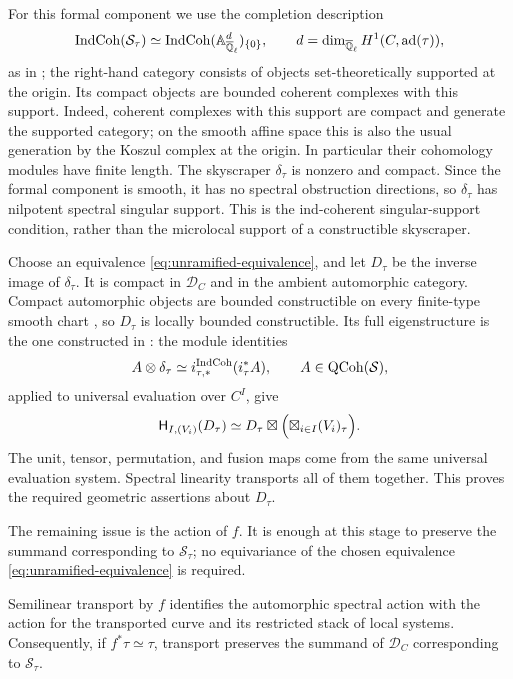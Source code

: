 For this formal component we use the completion description
\[
 \operatorname{IndCoh}(\mathcal S_\tau)
       \simeq\operatorname{IndCoh}(\mathbb A^d_{\overline{\mathbb Q}_{\ell}})_{\{0\}},
 \qquad d=\dim_{\overline{\mathbb Q}_{\ell}} H^1(C,\operatorname{ad}(\tau)),
\]
as in \cite[Sections~21.1.7--21.1.10]{AGKRRV}; the right-hand category
consists of objects set-theoretically supported at the origin.  Its
compact objects are bounded coherent complexes with this support.
Indeed, coherent complexes with this support are compact and generate the supported
category; on the smooth affine space this is also the usual generation
by the Koszul complex at the origin.  In particular their cohomology
modules have finite length.  The skyscraper $\delta_\tau$ is nonzero and
compact.  Since the formal component is smooth, it has no spectral
obstruction directions, so $\delta_\tau$ has nilpotent spectral singular
support.  This is the ind-coherent singular-support condition, rather
than the microlocal support of a constructible skyscraper.

Choose an equivalence \eqref{eq:unramified-equivalence}, and let $D_\tau$
be the inverse image of $\delta_\tau$.  It is compact in $\mathcal D_C$ and
in the ambient automorphic category.  Compact automorphic objects are
bounded constructible on every finite-type smooth chart
\cite[Appendix~F, Section~F.2.2]{AGKRRV}, so $D_\tau$ is locally bounded
constructible.  Its full eigenstructure is the one constructed in
\cite[Lemma~8.1]{CT}: the module identities
\begin{equation}\label{eq:skyscraper-evaluation}
 A\otimes\delta_\tau
       \simeq i_{\tau,*}^{\operatorname{IndCoh}}(i_\tau^*A),
       \qquad A\in\operatorname{QCoh}(\mathcal S),
\end{equation}
applied to universal evaluation over $C^I$, give
\begin{equation}\label{eq:unramified-eigenmaps}
 \mathsf H_{I,(V_i)}(D_\tau)
   \simeq D_\tau\boxtimes
            \Bigl(\boxtimes_{i\in I}(V_i)_\tau\Bigr).
\end{equation}
The unit, tensor, permutation, and fusion maps come from the same
universal evaluation system.  Spectral linearity transports all of them
together.  This proves the required geometric assertions about $D_\tau$.

The remaining issue is the action of $f$.  It is enough at this stage to
preserve the summand corresponding to $\mathcal S_\tau$; no equivariance
of the chosen equivalence \eqref{eq:unramified-equivalence} is required.

\begin{lemma}\label{lem:spectral-action-transport}
Semilinear transport by $f$ identifies the automorphic spectral action
with the action for the transported curve and its restricted stack of
local systems.  Consequently, if $f^*\tau\simeq\tau$, transport preserves
the summand of $\mathcal D_C$ corresponding to $\mathcal S_\tau$.
\end{lemma}

